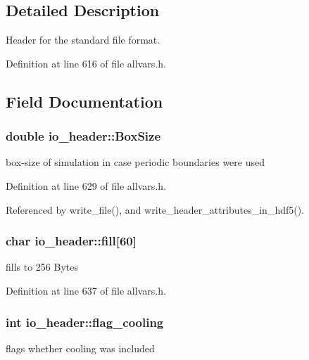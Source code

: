 \subsection{Detailed Description}
Header for the standard file format. 

Definition at line 616 of file allvars.h.



\subsection{Field Documentation}
\hypertarget{structio__header_aacb7ba10d16ae90490a9deba37ace731}{
\subsubsection[{BoxSize}]{\setlength{\rightskip}{0pt plus 5cm}double {\bf io\_\-header::BoxSize}}}
\label{structio__header_aacb7ba10d16ae90490a9deba37ace731}
box-\/size of simulation in case periodic boundaries were used 

Definition at line 629 of file allvars.h.



Referenced by write\_\-file(), and write\_\-header\_\-attributes\_\-in\_\-hdf5().

\hypertarget{structio__header_ac458badfa44878ddc5deb856531a2ee2}{
\subsubsection[{fill}]{\setlength{\rightskip}{0pt plus 5cm}char {\bf io\_\-header::fill}\mbox{[}60\mbox{]}}}
\label{structio__header_ac458badfa44878ddc5deb856531a2ee2}
fills to 256 Bytes 

Definition at line 637 of file allvars.h.

\hypertarget{structio__header_ae877c2fcde2f096886193c22b9b73cbf}{
\subsubsection[{flag\_\-cooling}]{\setlength{\rightskip}{0pt plus 5cm}int {\bf io\_\-header::flag\_\-cooling}}}
\label{structio__header_ae877c2fcde2f096886193c22b9b73cbf}
flags whether cooling was included 

